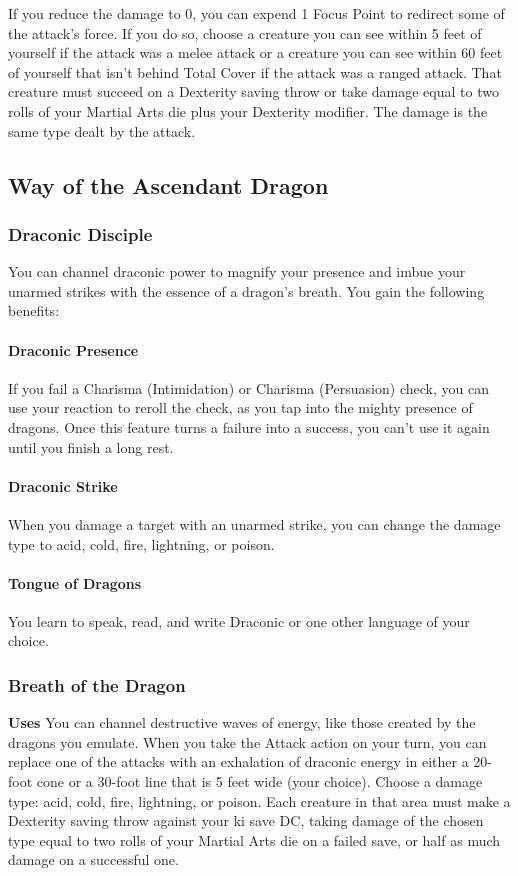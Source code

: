 \documentclass[letterpaper,openany,oneside,twocolumn]{book}
\begin{document}
If you reduce the damage to 0, you can expend 1 Focus Point to redirect some of the attack's force. If you do so, choose a creature you can see within 5 feet of yourself if the attack was a melee attack or a creature you can see within 60 feet of yourself that isn't behind Total Cover if the attack was a ranged attack. That creature must succeed on a Dexterity saving throw or take damage equal to two rolls of your Martial Arts die plus your Dexterity modifier. The damage is the same type dealt by the attack.
\subsection*{Way of the Ascendant Dragon}
\subsubsection*{Draconic Disciple}
You can channel draconic power to magnify your presence and imbue your unarmed strikes with the essence of a dragon's breath. You gain the following benefits:

\paragraph*{Draconic Presence} If you fail a Charisma (Intimidation) or Charisma (Persuasion) check, you can use your reaction to reroll the check, as you tap into the mighty presence of dragons. Once this feature turns a failure into a success, you can't use it again until you finish a long rest.

\paragraph*{Draconic Strike} When you damage a target with an unarmed strike, you can change the damage type to acid, cold, fire, lightning, or poison.

\paragraph*{Tongue of Dragons} You learn to speak, read, and write Draconic or one other language of your choice.
\subsubsection*{Breath of the Dragon}
\textbf{ Uses}
You can channel destructive waves of energy, like those created by the dragons you emulate. When you take the Attack action on your turn, you can replace one of the attacks with an exhalation of draconic energy in either a 20-foot cone or a 30-foot line that is 5 feet wide (your choice). Choose a damage type: acid, cold, fire, lightning, or poison. Each creature in that area must make a Dexterity saving throw against your ki save DC, taking damage of the chosen type equal to two rolls of your Martial Arts die on a failed save, or half as much damage on a successful one.
\end{document}

